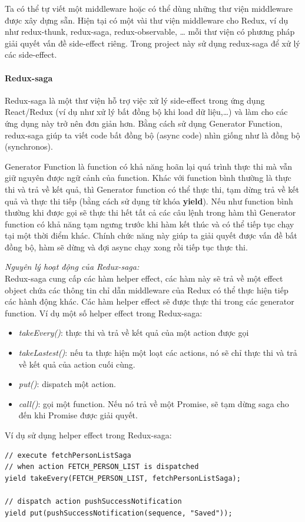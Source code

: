 Ta có thể tự viết một middleware hoặc có thể dùng những thư
viện middleware được xây dựng sẵn. Hiện tại có một vài thư viện
middleware cho Redux, ví dụ như redux-thunk, redux-saga,
redux-observable, … mỗi thư viện có phương pháp giải quyết
vấn đề side-effect riêng.
Trong project này sử dụng redux-saga để xử lý các side-effect.

\paragraph{Redux-saga}
Redux-saga là một thư viện hỗ trợ việc xử lý side-effect trong
ứng dụng React/Redux (ví dụ như xử lý bất đồng bộ khi load dữ liệu,…)
và làm cho các ứng dụng này trở nên đơn giản hơn.
Bằng cách sử dụng Generator Function, redux-saga giúp ta viết
code bất đồng bộ (async code) nhìn giống như là đồng bộ (synchronos).

Generator Function là function có khả năng hoãn lại quá trình
thực thi mà vẫn giữ nguyên được ngữ cảnh của function. Khác với
function bình thường là thực thi và trả về kết quả,
thì Generator function có thể thực thi, tạm dừng trả về
kết quả và thực thi tiếp (bằng cách sử dụng từ khóa \textbf{yield}).
Nếu như function bình thường khi được gọi sẽ thực thi hết tất cả
các câu lệnh trong hàm thì Generator function có khả năng tạm ngưng
trước khi hàm kết thúc và có thể tiếp tục chạy tại một thời điểm khác.
Chính chức năng này giúp ta giải quyết được vấn đề bất đồng bộ,
hàm sẽ dừng và đợi async chạy xong rồi tiếp tục thực thi.

\textit{Nguyên lý hoạt động của Redux-saga:} \\
Redux-saga cung cấp các hàm helper effect, các hàm này sẽ
trả về một effect object chứa các thông tin chỉ dẫn middleware
của Redux có thể thực hiện tiếp các hành động khác. Các hàm
helper effect sẽ được thực thi trong các generator function.
Ví dụ một số helper effect trong Redux-saga:
\begin{itemize}
\item \textit{takeEvery()}:
    thực thi và trả về kết quả của một action được gọi
\item \textit{takeLastest()}: nếu ta thực hiện một loạt các actions,
    nó sẽ chỉ thực thi và trả về kết quả của action cuối cùng.
\item \textit{put()}: dispatch một action.
\item \textit{call()}: gọi một function. Nếu nó trả về một Promise,
    sẽ tạm dừng saga cho đến khi Promise được giải quyết.
\end{itemize}
Ví dụ sử dụng helper effect trong Redux-saga:
\begin{lstlisting}[caption={Sử dụng Redux-Saga},captionpos=b]
// execute fetchPersonListSaga
// when action FETCH_PERSON_LIST is dispatched
yield takeEvery(FETCH_PERSON_LIST, fetchPersonListSaga);

// dispatch action pushSuccessNotification 
yield put(pushSuccessNotification(sequence, "Saved"));
\end{lstlisting}

